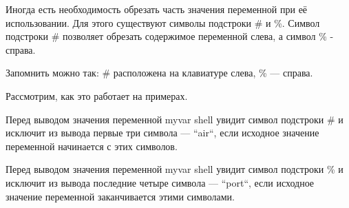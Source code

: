 Иногда есть необходимость обрезать часть значения переменной при её использовании. Для этого существуют символы подстроки \# и \%. Символ подстроки \# позволяет обрезать содержимое переменной слева, а символ \% - справа.

Запомнить можно так: \# расположена на клавиатуре слева, \% --- справа.

Рассмотрим, как это работает на примерах.


Перед выводом значения переменной myvar shell увидит символ подстроки \# и исключит из вывода первые три символа --- “air“, если исходное значение переменной начинается с этих символов. 


Перед выводом значения переменной myvar shell увидит символ подстроки \% и исключит из вывода последние четыре символа --- “port“, если исходное значение переменной заканчивается этими символами. 

	
